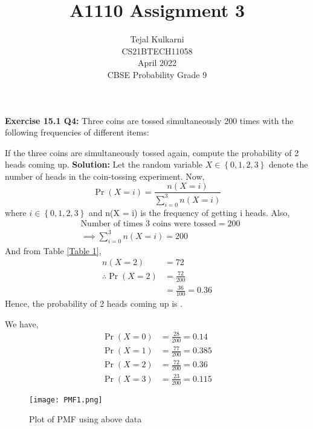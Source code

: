 \documentclass[journal,12pt,two column]{IEEEtran}
\title{A1110 Assignment 3 }
\author{Tejal Kulkarni \\ CS21BTECH11058 \\\vspace*{20pt} April 2022 \\ CBSE Probability Grade 9 }
\begin{document}
\newcommand{\solution}{\noindent \textbf{Solution: }}
\providecommand{\pr}[1]{\ensuremath{\Pr\left(#1\right)}}
\providecommand{\qfunc}[1]{\ensuremath{Q\left(#1\right)}}
\providecommand{\sbrak}[1]{\ensuremath{{}\left[#1\right]}}
\providecommand{\lsbrak}[1]{\ensuremath{{}\left[#1\right.}}
\providecommand{\rsbrak}[1]{\ensuremath{{}\left.#1\right]}}
\providecommand{\brak}[1]{\ensuremath{\left(#1\right)}}
\providecommand{\lbrak}[1]{\ensuremath{\left(#1\right.}}
\providecommand{\rbrak}[1]{\ensuremath{\left.#1\right)}}
\providecommand{\cbrak}[1]{\ensuremath{\left\{#1\right\}}}
\providecommand{\lcbrak}[1]{\ensuremath{\left\{#1\right.}}
\providecommand{\rcbrak}[1]{\ensuremath{\left.#1\right\}}}
\renewcommand{\thetable}{\arabic{table}} 

\maketitle

\textbf{Exercise 15.1 Q4:} Three coins are tossed simultaneously 200 times with the following frequencies of different items:
\begin{table}[ht!]
    \centering
    
    \caption{}
    \label{Table 1}
\end{table}

If the three coins are simultaneously tossed again, compute the probability of 2 heads coming up. 
\solution
Let the random variable $X \in \cbrak{0,1,2,3}$ denote the number of heads in the coin-tossing experiment. Now, 
\begin{equation}
   \pr{X = i} = \dfrac{n(X = i)}{\sum_{i=0}^{3} n(X = i) }
\end{equation}
where $i \in \cbrak{0,1,2,3}$ and n(X = i) is the frequency of getting i heads. Also,
\begin{align}
&\text{Number of times 3 coins were tossed} = 200\\ 
&\implies  \sum_{i=0}^{3} n(X = i) = 200
\end{align}
And from Table \ref{Table 1}, 
\begin{align}
                n(X = 2) &= 72 \\
\therefore    \pr{X = 2} &= \frac{72}{200} \\
                         &= \frac{36}{100} = 0.36 
\end{align}
Hence, the probability of 2 heads coming up is .

We have,
\begin{align}
\pr{X = 0} &= \frac{28}{200} = 0.14 \\
\pr{X = 1} &= \frac{77}{200} = 0.385 \\
\pr{X = 2} &= \frac{72}{200} = 0.36 \\
\pr{X = 3} &= \frac{23}{200} = 0.115 
\end{align}
\begin{figure}[ht!]
     \centering
     \texttt{[image: PMF1.png]}
     \caption{Plot of PMF using above data}
     \label{fig:Figure 1}
\end{figure}
\end{document}
